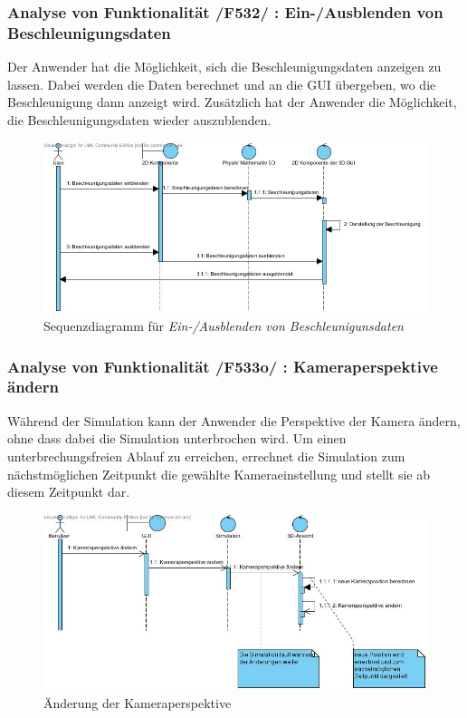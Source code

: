 \subsubsection{Analyse von Funktionalität /F532/ :  Ein-/Ausblenden von Beschleunigungsdaten}
Der Anwender hat die Möglichkeit, sich die Beschleunigungsdaten anzeigen zu lassen. Dabei werden die Daten berechnet und an die GUI übergeben, wo die Beschleunigung dann anzeigt wird. Zusätzlich hat der Anwender die Möglichkeit, die Beschleunigungsdaten wieder auszublenden.
\begin{figure}
\includegraphics[width=\linewidth]{bilder/Simulator_Beschleunigung}
\caption{Sequenzdiagramm für \textit{Ein-/Ausblenden von Beschleunigunsdaten}}
\end{figure}
\subsubsection{Analyse von Funktionalität /F533o/ :  Kameraperspektive ändern}
Während der Simulation kann der Anwender die Perspektive der Kamera ändern, ohne dass dabei die Simulation unterbrochen wird. Um einen unterbrechungsfreien Ablauf zu erreichen, errechnet die Simulation zum nächstmöglichen Zeitpunkt die gewählte Kameraeinstellung und stellt sie ab diesem Zeitpunkt dar. 
\begin{figure}
\includegraphics[width=\linewidth]{bilder/Kameraperspektive.jpg}
\caption{Änderung der Kameraperspektive}
\label{Kameraperspektive}
\end{figure}
